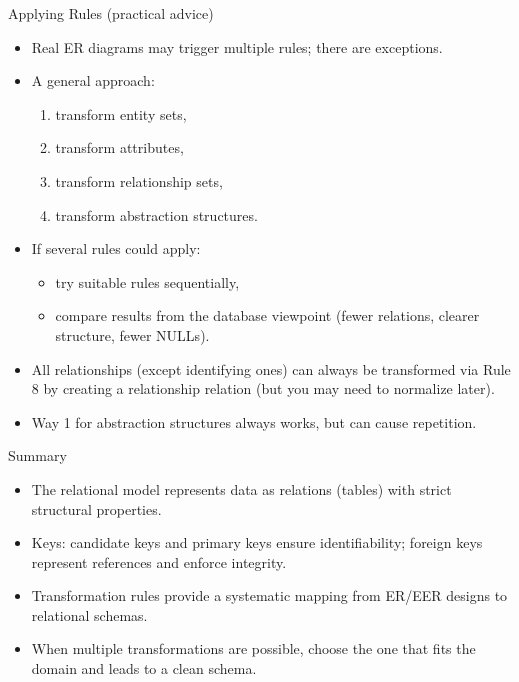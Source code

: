 \documentclass[10pt,aspectratio=169]{beamer}
\begin{document}
\begin{frame}{Applying Rules (practical advice)}
\small
\begin{itemize}
  \item Real ER diagrams may trigger multiple rules; there are exceptions.
  \item A general approach:
  \begin{enumerate}
    \item transform entity sets,
    \item transform attributes,
    \item transform relationship sets,
    \item transform abstraction structures.
  \end{enumerate}
  \item If several rules could apply:
  \begin{itemize}
    \item try suitable rules sequentially,
    \item compare results from the database viewpoint (fewer relations, clearer structure, fewer NULLs).
  \end{itemize}
  \item All relationships (except identifying ones) can always be transformed via Rule 8 by creating a relationship relation
        (but you may need to normalize later).
  \item Way 1 for abstraction structures always works, but can cause repetition.
\end{itemize}
\end{frame}

\begin{frame}{Summary}
\small
\begin{itemize}
  \item The relational model represents data as relations (tables) with strict structural properties.
  \item Keys: candidate keys and primary keys ensure identifiability; foreign keys represent references and enforce integrity.
  \item Transformation rules provide a systematic mapping from ER/EER designs to relational schemas.
  \item When multiple transformations are possible, choose the one that fits the domain and leads to a clean schema.
\end{itemize}
\end{frame}
\end{document}

